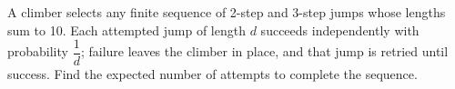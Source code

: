 A climber selects any finite sequence of 2-step and 3-step jumps whose lengths sum to 10. Each attempted jump of length $d$ succeeds independently with probability $\dfrac{1}{d}$; failure leaves the climber in place, and that jump is retried until success. Find the expected number of attempts to complete the sequence.
